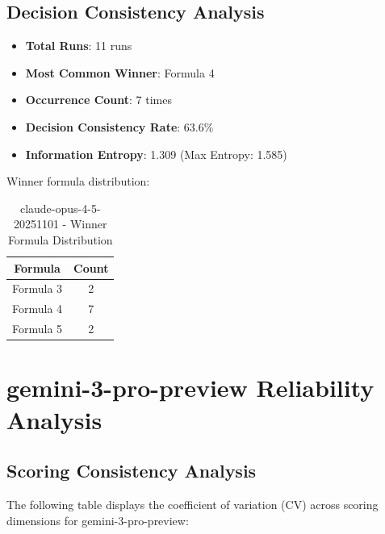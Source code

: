 \documentclass[12pt,a4paper]{article}
\begin{document}
\subsection{Decision Consistency Analysis}


\begin{itemize}
    \item \textbf{Total Runs}: 11 runs
    \item \textbf{Most Common Winner}: Formula 4
    \item \textbf{Occurrence Count}: 7 times
    \item \textbf{Decision Consistency Rate}: 63.6\%
    \item \textbf{Information Entropy}: 1.309 (Max Entropy: 1.585)
\end{itemize}

Winner formula distribution:

\begin{table}[H]
\centering
\caption{claude-opus-4-5-20251101 - Winner Formula Distribution}
\begin{tabular}{cc}
\toprule
\textbf{Formula} & \textbf{Count} \\
\midrule
Formula 3 & 2 \\
Formula 4 & 7 \\
Formula 5 & 2 \\
\bottomrule
\end{tabular}
\end{table}


\newpage


\section{gemini-3-pro-preview Reliability Analysis}

\subsection{Scoring Consistency Analysis}

The following table displays the coefficient of variation (CV) across scoring dimensions for gemini-3-pro-preview:
\end{document}
